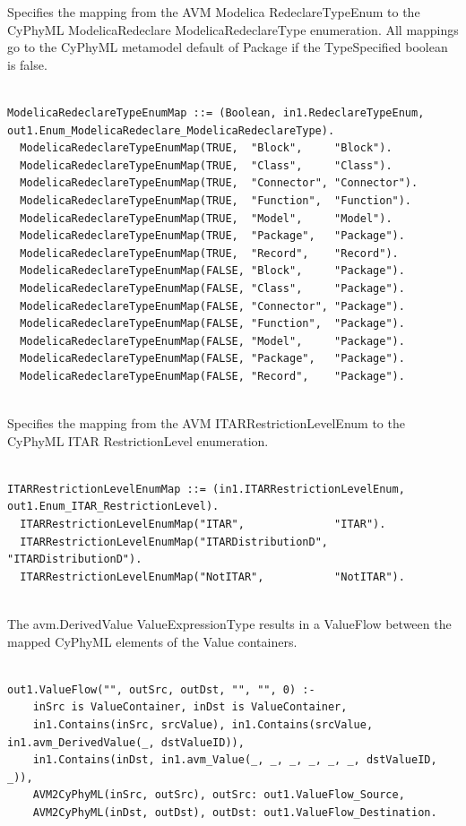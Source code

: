 Specifies the mapping from the AVM Modelica RedeclareTypeEnum to the CyPhyML ModelicaRedeclare ModelicaRedeclareType enumeration. All mappings go to the CyPhyML metamodel default of Package if the TypeSpecified boolean is false.
\begin{lstlisting}

ModelicaRedeclareTypeEnumMap ::= (Boolean, in1.RedeclareTypeEnum, out1.Enum_ModelicaRedeclare_ModelicaRedeclareType).
  ModelicaRedeclareTypeEnumMap(TRUE,  "Block",     "Block").
  ModelicaRedeclareTypeEnumMap(TRUE,  "Class",     "Class").
  ModelicaRedeclareTypeEnumMap(TRUE,  "Connector", "Connector").
  ModelicaRedeclareTypeEnumMap(TRUE,  "Function",  "Function").
  ModelicaRedeclareTypeEnumMap(TRUE,  "Model",     "Model").
  ModelicaRedeclareTypeEnumMap(TRUE,  "Package",   "Package").
  ModelicaRedeclareTypeEnumMap(TRUE,  "Record",    "Record").
  ModelicaRedeclareTypeEnumMap(FALSE, "Block",     "Package").
  ModelicaRedeclareTypeEnumMap(FALSE, "Class",     "Package").
  ModelicaRedeclareTypeEnumMap(FALSE, "Connector", "Package").
  ModelicaRedeclareTypeEnumMap(FALSE, "Function",  "Package").
  ModelicaRedeclareTypeEnumMap(FALSE, "Model",     "Package").
  ModelicaRedeclareTypeEnumMap(FALSE, "Package",   "Package").
  ModelicaRedeclareTypeEnumMap(FALSE, "Record",    "Package").


\end{lstlisting}

Specifies the mapping from the AVM ITARRestrictionLevelEnum to the CyPhyML ITAR RestrictionLevel enumeration.
\begin{lstlisting}

ITARRestrictionLevelEnumMap ::= (in1.ITARRestrictionLevelEnum, out1.Enum_ITAR_RestrictionLevel).
  ITARRestrictionLevelEnumMap("ITAR",              "ITAR").
  ITARRestrictionLevelEnumMap("ITARDistributionD", "ITARDistributionD").
  ITARRestrictionLevelEnumMap("NotITAR",           "NotITAR").


\end{lstlisting}

The avm.DerivedValue ValueExpressionType results in a ValueFlow between the mapped CyPhyML elements of the Value containers.
\begin{lstlisting}

out1.ValueFlow("", outSrc, outDst, "", "", 0) :-
    inSrc is ValueContainer, inDst is ValueContainer,
    in1.Contains(inSrc, srcValue), in1.Contains(srcValue, in1.avm_DerivedValue(_, dstValueID)),
    in1.Contains(inDst, in1.avm_Value(_, _, _, _, _, _, dstValueID, _)),
    AVM2CyPhyML(inSrc, outSrc), outSrc: out1.ValueFlow_Source,
    AVM2CyPhyML(inDst, outDst), outDst: out1.ValueFlow_Destination.


\end{lstlisting}

